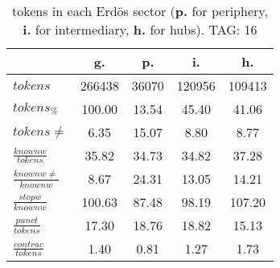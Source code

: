\begin{table}[h!]
\begin{center}
\begin{tabular}{| l || c | c | c | c |}\hline
 & {\bf g.} & {\bf p.} & {\bf i.} & {\bf h.} \\\hline\hline
$tokens$ & 266438  & 36070  & 120956  & 109413 \\
$tokens_{\%}$ & 100.00  & 13.54  & 45.40  & 41.06 \\
$tokens \neq$ & 6.35  & 15.07  & 8.80  & 8.77 \\\hline
$\frac{knownw}{tokens}$ & 35.82  & 34.73  & 34.82  & 37.28 \\
$\frac{knownw \neq}{knownw}$ & 8.67  & 24.31  & 13.05  & 14.21 \\\hline
$\frac{stopw}{knownw}$ & 100.63  & 87.48  & 98.19  & 107.20 \\
$\frac{punct}{tokens}$ & 17.30  & 18.76  & 18.82  & 15.13 \\
$\frac{contrac}{tokens}$ & 1.40  & 0.81  & 1.27  & 1.73 \\\hline
\end{tabular}
\caption{tokens in each Erd\"os sector ({{\bf p.}} for periphery, {{\bf i.}} for intermediary, 
    {{\bf h.}} for hubs). TAG: 16}
\end{center}
\end{table}